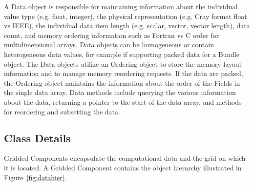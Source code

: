 A Data object is responsible for maintaining
information about the individual value type (e.g. float, integer), 
the physical representation (e.g. Cray format float vs IEEE), the 
individual data item length (e.g. scalar, vector, vector length), 
data count, and memory ordering information such as Fortran vs C order 
for multidimensional arrays.  Data objects can be homogeneous or
contain heterogeneous data values, for example if supporting
packed data for a Bundle object.
The Data objects utilize an Ordering object to store the
memory layout information and to manage memory reordering requests.
If the data are packed, the Ordering object maintains the information
about the order of the Fields in the single data array.
Data methods include querying the various information about the
data, returning a pointer to the start of the data
array, and methods for reordering and subsetting the data.


%

\subsection{Class Details}

Gridded Components encapsulate the computational data and the
grid on which it is located.  A Gridded Component contains
the object hierarchy illustrated in Figure~\ref{fig:datahier}.

